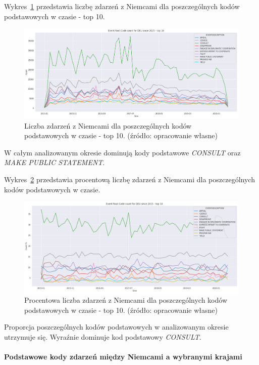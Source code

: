 \documentclass[11pt]{report}
\begin{document}
    Wykres~\ref{fig:DEUPERCinTIME} przedstawia liczbę zdarzeń z Niemcami dla poszczególnych kodów podstawowych w czasie - top 10.
    \begin{figure}[!htp]
        \centering
        \includegraphics[width=\linewidth]{fig/DEU/DEUERCinTIME.png}
        \caption{Liczba zdarzeń z Niemcami dla poszczególnych kodów podstawowych w czasie - top 10. (źródło: opracowanie własne)}
        \label{fig:DEUPERCinTIME}
    \end{figure}
    W całym analizowanym okresie dominują kody podstawowe \textit{CONSULT} oraz \textit{MAKE PUBLIC STATEMENT}.

    Wykres~\ref{fig:DEUPERCpercinTIME} przedstawia procentową liczbę zdarzeń z Niemcami dla poszczególnych kodów podstawowych w czasie.
    \begin{figure}[!htp]
        \centering
        \includegraphics[width=\linewidth]{fig/DEU/DEUERCpercinTIME.png}
        \caption{Procentowa liczba zdarzeń z Niemcami dla poszczególnych kodów podstawowych w czasie - top 10. (źródło: opracowanie własne)}
        \label{fig:DEUPERCpercinTIME}
    \end{figure}
    Proporcja poszczególnych kodów podstawowych w analizowanym okresie utrzymuje się.
    Wyraźnie dominuje kod podstawowy \textit{CONSULT}.

    \paragraph{Podstawowe kody zdarzeń między Niemcami a wybranymi krajami}
\end{document}
